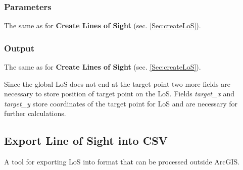 \documentclass[]{article}
\begin{document}
\subsubsection{Parameters}
The same as for \textbf{Create Lines of Sight} (sec. \ref{Sec:createLoS}).

\subsubsection{Output}

The same as for \textbf{Create Lines of Sight} (sec. \ref{Sec:createLoS}).

Since the global LoS does not end at the target point two more fields are necessary to store position of target point on the LoS. Fields \textit{target\_x} and \textit{target\_y} store coordinates of the target point for LoS and are necessary for further calculations.


\subsection{Export Line of Sight into CSV}

A tool for exporting LoS into format that can be processed outside ArcGIS.
\end{document}
